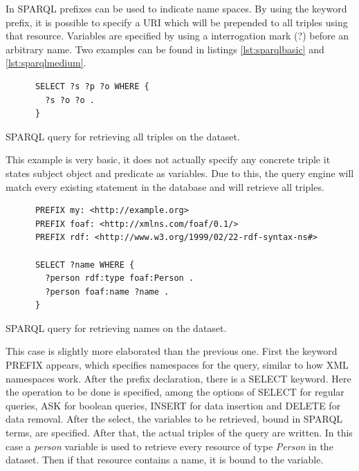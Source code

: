 In SPARQL prefixes can be used to indicate name spaces. By using the keyword prefix, it is possible to specify a URI which will be prepended to all triples using that resource. Variables are specified by using a interrogation mark (?) before an arbitrary name. Two examples can be found in listings \ref{lst:sparqlbasic} and \ref{lst:sparqlmedium}.

\begin{listing}[ht]\centering
  \begin{minipage}{.6\textwidth}
    \begin{verbatim}
      SELECT ?s ?p ?o WHERE {
      	?s ?o ?o .
      }
    \end{verbatim}
  \end{minipage}
  \caption{SPARQL query for retrieving all triples on the dataset.}\label{lst:sparqlbasic}
\end{listing}

This example is very basic, it does not actually specify any concrete triple it states subject object and predicate as variables. Due to this, the query engine will match every existing statement in the database and will retrieve all triples.

\begin{listing}[ht]\centering
  \begin{minipage}{.7\textwidth}
    \begin{verbatim}
      PREFIX my: <http://example.org>
      PREFIX foaf: <http://xmlns.com/foaf/0.1/>
      PREFIX rdf: <http://www.w3.org/1999/02/22-rdf-syntax-ns#>
      
      SELECT ?name WHERE {
      	?person rdf:type foaf:Person .
      	?person foaf:name ?name .
      }
    \end{verbatim}
  \end{minipage}
  \caption{SPARQL query for retrieving names on the dataset.}\label{lst:sparqlmedium}
\end{listing}

This case is slightly more elaborated than the previous one. First the keyword PREFIX appears, which specifies namespaces for the query, similar to how XML namespaces work. After the prefix declaration, there is a SELECT keyword. Here the operation to be done is specified, among the options of SELECT for regular queries, ASK for boolean queries, INSERT for data insertion and DELETE for data removal. After the select, the variables to be retrieved, bound in SPARQL terms, are specified. After that, the actual triples of the query are written. In this case a \textit{person} variable is used to retrieve every resource of type \textit{Person} in the dataset. Then if that resource contains a name, it is bound to the variable.

